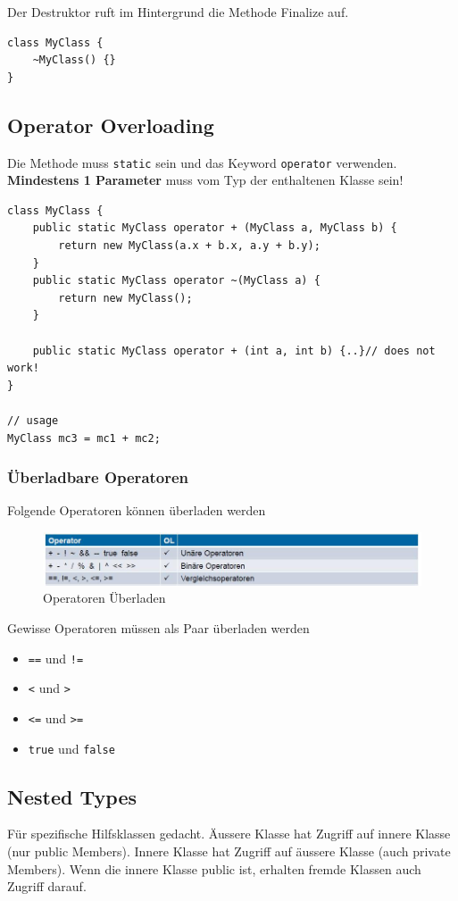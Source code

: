 \documentclass[
a4paper,
oneside,
10pt,
fleqn,
headsepline,
toc=listofnumbered, 
bibliography=totocnumbered]{scrartcl}
\begin{document}
Der Destruktor ruft im Hintergrund die Methode Finalize auf. 
\begin{lstlisting}
class MyClass {
	~MyClass() {}
}
\end{lstlisting}

\subsection{Operator Overloading}
Die Methode muss \lstinline|static| sein und das Keyword \lstinline|operator| verwenden. \textbf{Mindestens 1 Parameter} muss vom Typ der enthaltenen Klasse sein!
\begin{lstlisting}
class MyClass {
	public static MyClass operator + (MyClass a, MyClass b) {
		return new MyClass(a.x + b.x, a.y + b.y);
	}
	public static MyClass operator ~(MyClass a) {
		return new MyClass();
	}
	
	public static MyClass operator + (int a, int b) {..}// does not work!
}

// usage
MyClass mc3 = mc1 + mc2;
\end{lstlisting}

\subsubsection{Überladbare Operatoren}

Folgende Operatoren können überladen werden
\begin{figure}[h!]
\centering
\includegraphics[width=0.7\linewidth]{images/operator_overloading}
\caption{Operatoren Überladen}
\label{fig:operatoroverloading}
\end{figure}

Gewisse Operatoren müssen als Paar überladen werden

\begin{itemize}
    \item \lstinline|==| und \lstinline|!=|
    \item \lstinline|<| und \lstinline|>|
    \item \lstinline|<=| und \lstinline|>=|
    \item \lstinline|true| und \lstinline|false|
\end{itemize}

\subsection{Nested Types}
Für spezifische Hilfsklassen gedacht. Äussere Klasse hat Zugriff auf innere Klasse (nur public Members). Innere Klasse hat Zugriff auf äussere Klasse (auch private Members). Wenn die innere Klasse public ist, erhalten fremde Klassen auch Zugriff darauf.
\end{document}
